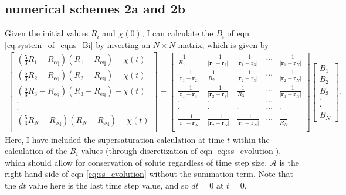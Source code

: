 \documentclass[12pt]{article}
\begin{document}
\subsection{numerical schemes 2a and 2b}

Given the initial values $R_i$ and $\chi(0)$, I can calculate the $B_i$ of eqn \ref{eq:system_of_eqns_Bi} by inverting an $N\times N$ matrix, which is given by
\begin{align}\label{eq:matrix_Nside}
\begin{bmatrix}
\left(\frac{5}{3}R_1-R_{\text{eq}}\right)(R_1-R_{\text{eq}})-\chi(t) \\
\left(\frac{5}{3}R_2-R_{\text{eq}}\right)(R_2-R_{\text{eq}})-\chi(t) \\
\left(\frac{5}{3}R_3-R_{\text{eq}}\right)(R_3-R_{\text{eq}})-\chi(t) \\
\cdot \\
\cdot \\
\left(\frac{5}{3}R_N-R_{\text{eq}}\right)(R_N-R_{\text{eq}})-\chi(t) \\
\end{bmatrix}=
\begin{bmatrix}
\frac{-1}{R_1} & \frac{-1}{|\bm{r}_1-\bm{r}_2|} & \frac{-1}{|\bm{r}_1-\bm{r}_3|} & \cdots & \frac{-1}{|\bm{r}_1-\bm{r}_N|}\\
\frac{-1}{|\bm{r}_1-\bm{r}_2|} & \frac{-1}{R_2} & \frac{-1}{|\bm{r}_2-\bm{r}_3|} & \cdots & \frac{-1}{|\bm{r}_2-\bm{r}_N|}\\
\frac{-1}{|\bm{r}_1-\bm{r}_3|} & \frac{-1}{|\bm{r}_2-\bm{r}_3|} & \frac{-1}{R_3} & \cdots  & \frac{-1}{|\bm{r}_3-\bm{r}_N|}\\
\cdot & \cdot &\cdot & \cdots & \cdot \\
\cdot & \cdot &\cdot & \cdots & \cdot \\
\frac{-1}{|\bm{r}_1-\bm{r}_N|} & \frac{-1}{|\bm{r}_2-\bm{r}_N|} & \frac{-1}{|\bm{r}_3-\bm{r}_N|} & \cdots  & \frac{-1}{R_N}\\
\end{bmatrix}
\begin{bmatrix}
B_1 \\
B_2 \\
B_3 \\
\cdot \\
\cdot \\
B_N
\end{bmatrix}.
\end{align}
Here, I have included the supersaturation calculation at time $t$ within the calculation of the $B_i$ values (through discretization of eqn \ref{eq:ss_evolution}), which should allow for conservation of solute regardless of time step size. $\mathcal{A}$ is the right hand side of eqn \ref{eq:ss_evolution} without the summation term. Note that the $dt$ value here is the last time step value, and so $dt=0$ at $t=0$.
\end{document}
